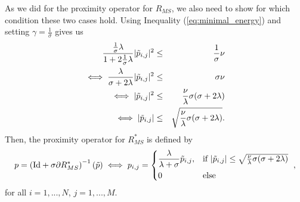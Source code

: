 \documentclass[abstracton]{scrreprt}
\begin{document}
            As we did for the proximity operator for $R_{MS}$, we also need to show for which condition these two cases hold. Using Inequality (\ref{eq:minimal_energy}) and setting $\gamma = \frac{1}{\sigma}$ gives us
                \begin{eqnarray}
                    \frac{\frac{1}{\sigma}\lambda}{1 + 2\frac{1}{\sigma}\lambda} |\tilde{p}_{i,j}|^{2} &\le& \frac{1}{\sigma} \nu \notag \\
                    \iff \frac{\lambda}{\sigma + 2\lambda} |\tilde{p}_{i,j}|^{2} &\le& \sigma \nu \notag \\
                    \iff |\tilde{p}_{i,j}|^{2} &\le& \frac{\nu}{\lambda}\sigma(\sigma + 2\lambda) \notag \\
                    \iff |\tilde{p}_{i,j}| &\le& \sqrt{\frac{\nu}{\lambda}\sigma(\sigma + 2\lambda)}. \notag
                \end{eqnarray}
            Then, the proximity operator for $R_{MS}^{\ast}$ is defined by
                \begin{equation}
                    p = \left( \textnormal{Id} + \sigma \partial R_{MS}^{\ast} \right)^{-1}(\tilde{p}) \iff p_{i,j} =
                        \begin{dcases*}
                            \frac{\lambda}{\lambda + \sigma} \tilde{p}_{i,j}, & \textnormal{if $|\tilde{p}_{i,j}| \le \sqrt{\frac{\nu}{\lambda}\sigma(\sigma + 2\lambda)}$} \\
                            0 & \textnormal{else}
                        \end{dcases*},
                    \label{eq:proximity_operator_r_star}
                \end{equation}
            for all $i = 1, ..., N$, $j = 1, ..., M$.
\end{document}
